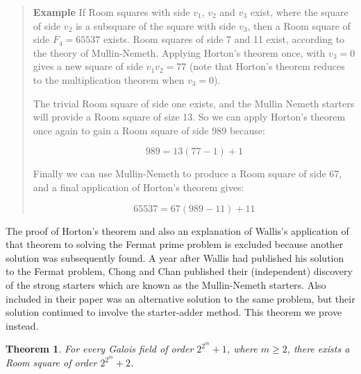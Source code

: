 \documentclass[
  11pt,
  a4paper]{book}
\newtheorem{theorem}{Theorem}
\newcounter{examplecounter}
\begin{document}
\begin{quote}  \textbf{Example } \quad 
If Room squares with side $v_1$, $v_2$ and $v_3$ exist,
where the square of side $v_2$ is a subsquare of the square
with side $v_3$, then a Room square of side $F_4 = 65537$
exists. Room squares of side 7 and 11 exist, according to
the theory of Mullin-Nemeth. Applying Horton’s theorem
once, with $v_3 = 0$ gives a new square of side $v_1v_2 = 77$
(note that Horton’s theorem reduces to the multiplication
theorem when $v_3 = 0$).

The trivial Room square of side one exists, and the Mullin
Nemeth starters will provide a Room square of size 13. So we
can apply Horton’s theorem once again to gain a Room square
of side 989 because:

\begin{equation}
989 = 13(77 - 1) + 1
\end{equation}

Finally we can use Mullin-Nemeth to produce a Room square of
side 67, and a final application of Horton’s theorem gives:

\begin{equation}
65537 = 67(989 - 11) + 11
\end{equation}

 \end{quote}

The proof of Horton's theorem and also an explanation of
Wallis's application of that theorem to solving the Fermat
prime problem is excluded because another solution was
subsequently found. A year after Wallis had published his
solution to the Fermat problem, Chong and Chan published
their (independent) discovery of the strong starters which
are known as the Mullin-Nemeth starters. Also included in
their paper was an alternative solution to the same problem,
but their solution continued to involve the starter-adder
method. This theorem we prove instead.

\begin{theorem}
\label{thm:chong-chan}
For every Galois field of order $2^{2^m} + 1$, where
$m \geq 2$, there exists a Room square of order
$2^{2^m} + 2$.
\end{theorem}
\end{document}
